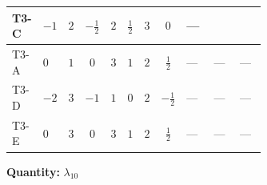 \documentclass[8pt]{article}
\begin{document}
\begin{landscape}
\begin{longtable}{@{}llcccccc >{\raggedright\arraybackslash}p{0.21\linewidth} >{\raggedright\arraybackslash}p{0.21\linewidth} >{\raggedright\arraybackslash}p{0.21\linewidth}@{}}
\midrule
T3-C & $-1$ & $2$ & $-\frac{1}{2}$ & $2$ & $\frac{1}{2}$ & $3$ & $0$ & --- & \scriptsize\adjustbox{max width=\linewidth}{$\begin{gathered} +{\lambda_{12}^{(A)}} \left(\frac{1}{8} \operatorname{Tr}\!\left({y_2}\,\left({y_1}\right)^{\dagger}\right)+\frac{5 {\lambda_{10}}}{6}+\frac{{\lambda_{11}}}{6}\right)\end{gathered}$} & \scriptsize\adjustbox{max width=\linewidth}{$\begin{gathered} +{\lambda_{9}} (3 \operatorname{Tr}\!\left({y_1}\,\left({y_2}\right)^{\dagger}\right)+4 (5 \left({\lambda_{10}}\right)^{*}+\left({\lambda_{11}}\right)^{*}))\end{gathered}$} \\
\midrule
T3-A & $0$ & $1$ & $0$ & $3$ & $1$ & $2$ & $\frac{1}{2}$ & --- & --- & --- \\
\midrule
T3-D & $-2$ & $3$ & $-1$ & $1$ & $0$ & $2$ & $-\frac{1}{2}$ & --- & --- & --- \\
\midrule
T3-E & $0$ & $3$ & $0$ & $3$ & $1$ & $2$ & $\frac{1}{2}$ & --- & --- & --- \\
\midrule
\bottomrule
\end{longtable}
\clearpage
\noindent\textbf{Quantity: }$\lambda_{10}$\par\smallskip

\end{landscape}
\end{document}
